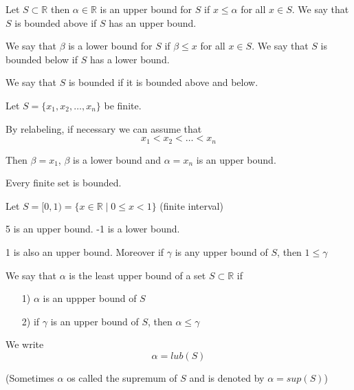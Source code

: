 


\begin{thm}
Let $S\subset \mathbb{R}$ then $\alpha \in \mathbb{R}$ is an upper bound for $S$ if $x\leq \alpha$ for all $x\in S$. We say that $S$ is bounded above if $S$ has an upper bound.

We say that $\beta$ is a lower bound for $S$ if $\beta \leq x$ for all $x\in S$. We say that $S$ is bounded below if $S$ has a lower bound.

We say that $S$ is bounded if it is bounded above and below.
\end{thm}

\begin{exmp} Let $S=\{x_1,x_2,\dots ,x_n\}$ be finite.

By relabeling, if necessary we can assume that \[x_1<x_2<\dots <x_n\]

Then $\beta = x_1$, $\beta$ is a lower bound and $\alpha = x_n$ is an upper bound.

\end{exmp}

\begin{thm}
Every finite set is bounded.
\end{thm}

\begin{exmp}
Let $S=[0,1)=\{x\in \mathbb{R} \mid 0\leq x < 1\}$ (finite interval)

5 is an upper bound. -1 is a lower bound.

1 is also an upper bound. Moreover if $\gamma$ is any upper bound of $S$, then $1 \leq \gamma$
\end{exmp}



\begin{thm}
We say that $\alpha$ is the least upper bound of a set $S\subset \mathbb{R}$ if 
\begin{enumerate}
\item[1)] $\alpha$ is an uppper bound of $S$
\item[2)] if $\gamma$ is an upper bound of $S$, then $\alpha \leq \gamma$
\end{enumerate}
 
We write $$\alpha = lub(S)$$

(Sometimes $\alpha$ os called the supremum of $S$ and is denoted by $\alpha = sup(S)$)
\end{thm}

